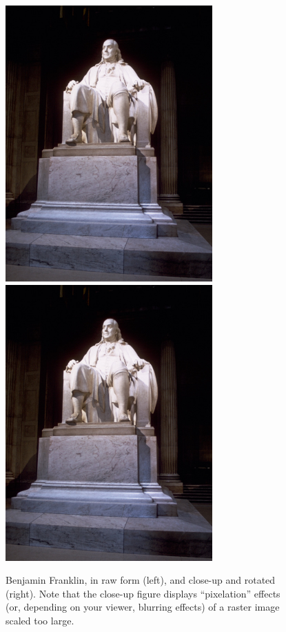 \begin{figure}
\begin{center}
\includegraphics{figs/ben}
\includegraphics[viewport=.9in 2.1in 1.15in 2.35in,clip,
    scale=10.67,angle=90]{figs/ben}
\end{center}
\caption{Benjamin Franklin, in raw form (left), and close-up and
  rotated (right). Note that the close-up figure displays
  ``pixelation'' effects (or, depending on your viewer, blurring
  effects) of a raster image scaled too large.}
\label{franklin}
\end{figure}

